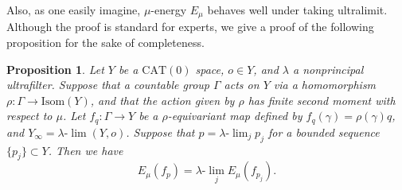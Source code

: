 \documentclass[12pt]{amsart}
\numberwithin{equation}{section}
\theoremstyle{plain}
\newtheorem{Proposition}[Theorem]{Proposition}
\theoremstyle{definition}
\theoremstyle{remark}
\newcommand{\ene}[1]{E_{#1}}
\newcommand{\isom}[1]{\mathrm{Isom}({#1})}
\newcommand{\cat}[1]{\mathrm{CAT}(#1)}
\newcommand{\ulim}{\lambda{\text{-}}\!\lim}
\begin{document}
%
%
Also, as one easily imagine,  $\mu$-energy $\ene{\mu}$ behaves well under
taking ultralimit.
Although the proof is standard for experts, we give a proof of the
following proposition for the sake of completeness. 

\begin{Proposition}
 \label{prop:energy_limit}
 Let $Y$ be a $\cat{0}$ space, $o\in Y$, and 
 $\lambda$ a nonprincipal ultrafilter. 
 Suppose that a countable group $\Gamma$ acts on $Y$ via a
 homomorphism $\rho\colon \Gamma \rightarrow \isom{Y}$, and that the
 action given by $\rho$ has finite second moment with respect to $\mu$.
 Let $f_q \colon \Gamma \rightarrow Y$ be a $\rho$-equivariant map
 defined by $f_q(\gamma)=\rho(\gamma)q$, and 
 $Y_{\infty}=\ulim (Y,o)$. 
 Suppose that $p= \ulim_j p_j$ for a bounded sequence
 $\{p_j\}\subset Y$.  Then we have
 \begin{equation*}
  \ene{\mu} (f_p) = \ulim_j \ene{\mu}(f_{p_j}). 
 \end{equation*} 
\end{Proposition}
\end{document}
